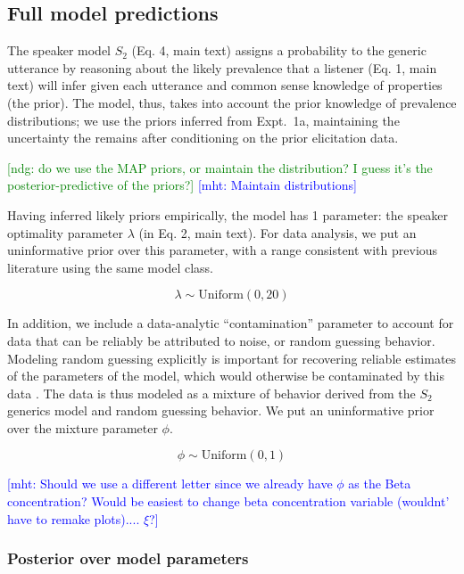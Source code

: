 \documentclass[10pt,letterpaper]{article}
\newcommand{\ndg}[1]{\textcolor{Green}{[ndg: #1]}}
\newcommand{\mht}[1]{\textcolor{Blue}{[mht: #1]}}
\begin{document}
\subsection{Full model predictions}

The speaker model $S_2$ (Eq. 4, main text) assigns a probability to the generic utterance by reasoning about the likely prevalence that a listener (Eq. 1, main text) will infer given each utterance and common sense knowledge of properties (the prior). 
The model, thus, takes into account the prior knowledge of prevalence distributions; we use the priors inferred from Expt.~1a, maintaining the uncertainty the remains after conditioning on the prior elicitation data. 

\ndg{do we use the MAP priors, or maintain the distribution? I guess it's the posterior-predictive of the priors?} 
\mht{Maintain distributions}


Having inferred likely priors empirically, the model has 1 parameter: the speaker optimality parameter $\lambda$ (in Eq. 2, main text). 
For data analysis, we put an uninformative prior over this parameter, with a range consistent with previous literature using the same model class.

$$
\lambda \sim \text{Uniform}(0,20)
$$

In addition, we include a data-analytic ``contamination'' parameter to account for data that can be reliably be attributed to noise, or random guessing behavior.
Modeling random guessing explicitly is important for recovering reliable estimates of the parameters of the model, which would otherwise be contaminated by this data \cite{LW2014}.
The data is thus modeled as a mixture of behavior derived from the $S_2$ generics model and random guessing behavior. 
We put an uninformative prior over the mixture parameter $\phi$.

$$
\phi \sim \text{Uniform}(0,1)
$$

\mht{Should we use a different letter since we already have $\phi$ as the Beta concentration? Would be easiest to change beta concentration variable (wouldnt' have to remake plots).... $\xi$?}


\subsubsection{Posterior over model parameters}
\end{document}
